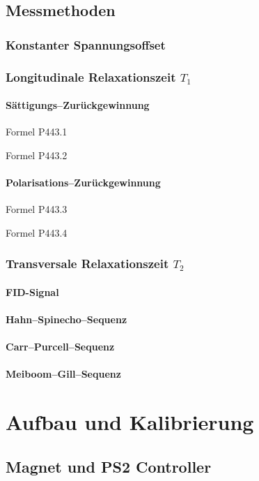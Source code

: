 \section{Messmethoden}
\subsection{Konstanter Spannungsoffset}
\subsection{Longitudinale Relaxationszeit $T_1$}
\subsubsection{Sättigungs–Zurückgewinnung}

Formel P443.1

Formel P443.2

\subsubsection{Polarisations–Zurückgewinnung}

Formel P443.3

Formel P443.4

\subsection{Transversale Relaxationszeit $T_2$}
\subsubsection{FID-Signal}
\subsubsection{Hahn–Spinecho–Sequenz}
\subsubsection{Carr–Purcell–Sequenz}
\subsubsection{Meiboom–Gill–Sequenz}

\chapter{Aufbau und Kalibrierung}
\section{Magnet und PS2 Controller}
